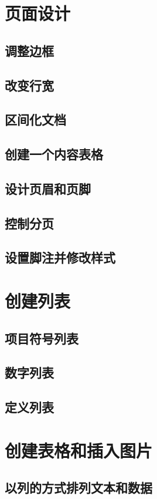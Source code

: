 \documentclass{book}
\begin{document}
\tableofcontents
	
	
\chapter{页面设计}
	\section{调整边框}
	\section{改变行宽}
	\section{区间化文档}
	\section{创建一个内容表格}
	\section{设计页眉和页脚}
	\section{控制分页}
	\section{设置脚注并修改样式}
\chapter{创建列表}
	\section{项目符号列表}
	\section{数字列表}
	\section{定义列表}
\chapter{创建表格和插入图片}
	\section{以列的方式排列文本和数据}
\end{document}
